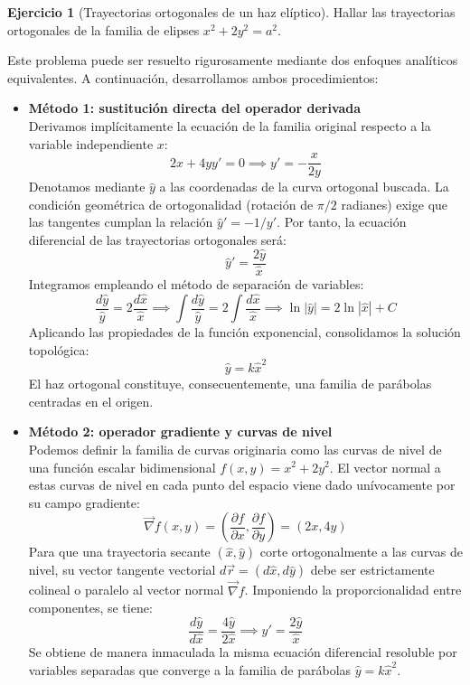 \documentclass[11pt,a4paper]{article}
\theoremstyle{definition}
\newtheorem{exercise}{Ejercicio}[section]
\theoremstyle{plain}
\begin{document}
\begin{exercise}[Trayectorias ortogonales de un haz elíptico]
Hallar las trayectorias ortogonales de la familia de elipses $x^2 + 2y^2 = a^2$.
\end{exercise}

\begin{tcolorbox}
Este problema puede ser resuelto rigurosamente mediante dos enfoques analíticos equivalentes. A continuación, desarrollamos ambos procedimientos:

\begin{itemize}
    \item \textbf{Método 1: sustitución directa del operador derivada} \\
    Derivamos implícitamente la ecuación de la familia original respecto a la variable independiente $x$:
    $$ 2x + 4yy' = 0 \implies y' = -\frac{x}{2y} $$
    Denotamos mediante $\hat{y}$ a las coordenadas de la curva ortogonal buscada. La condición geométrica de ortogonalidad (rotación de $\pi/2$ radianes) exige que las tangentes cumplan la relación $\hat{y}' = -1/y'$. Por tanto, la ecuación diferencial de las trayectorias ortogonales será:
    $$ \hat{y}' = \frac{2\hat{y}}{\hat{x}} $$
    Integramos empleando el método de separación de variables:
    $$ \frac{d\hat{y}}{\hat{y}} = 2\frac{d\hat{x}}{\hat{x}} \implies \int \frac{d\hat{y}}{\hat{y}} = 2\int \frac{d\hat{x}}{\hat{x}} \implies \ln|\hat{y}| = 2\ln|\hat{x}| + C $$
    Aplicando las propiedades de la función exponencial, consolidamos la solución topológica:
    $$ \hat{y} = k\hat{x}^2 $$
    El haz ortogonal constituye, consecuentemente, una familia de parábolas centradas en el origen.

    \item \textbf{Método 2: operador gradiente y curvas de nivel} \\
    Podemos definir la familia de curvas originaria como las curvas de nivel de una función escalar bidimensional $f(x,y) = x^2 + 2y^2$. El vector normal a estas curvas de nivel en cada punto del espacio viene dado unívocamente por su campo gradiente:
    $$ \vec{\nabla}f(x,y) = \left( \frac{\partial f}{\partial x}, \frac{\partial f}{\partial y} \right) = (2x, 4y) $$
    Para que una trayectoria secante $(\hat{x}, \hat{y})$ corte ortogonalmente a las curvas de nivel, su vector tangente vectorial $d\vec{r} = (d\hat{x}, d\hat{y})$ debe ser estrictamente colineal o paralelo al vector normal $\vec{\nabla}f$. Imponiendo la proporcionalidad entre componentes, se tiene:
    $$ \frac{d\hat{y}}{d\hat{x}} = \frac{4\hat{y}}{2\hat{x}} \implies \hat{y}' = \frac{2\hat{y}}{\hat{x}} $$
    Se obtiene de manera inmaculada la misma ecuación diferencial resoluble por variables separadas que converge a la familia de parábolas $\hat{y} = k\hat{x}^2$.
\end{itemize}


\end{tcolorbox}
\end{document}
